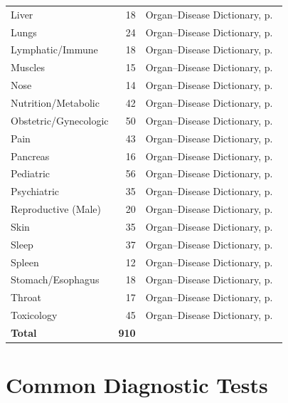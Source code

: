 \begin{tabularx}{\textwidth}{lrc}
Liver                & 18  & Organ--Disease Dictionary, p.~\pageref{sec:organ_liver} \\
Lungs                & 24  & Organ--Disease Dictionary, p.~\pageref{sec:organ_lungs} \\
Lymphatic/Immune     & 18  & Organ--Disease Dictionary, p.~\pageref{sec:organ_lymph} \\
Muscles              & 15  & Organ--Disease Dictionary, p.~\pageref{sec:organ_muscles} \\
Nose                 & 14  & Organ--Disease Dictionary, p.~\pageref{sec:organ_nose} \\
Nutrition/Metabolic  & 42  & Organ--Disease Dictionary, p.~\pageref{sec:organ_nutrition} \\
Obstetric/Gynecologic& 50  & Organ--Disease Dictionary, p.~\pageref{sec:organ_obstetric} \\
Pain                 & 43  & Organ--Disease Dictionary, p.~\pageref{sec:organ_pain} \\
Pancreas             & 16  & Organ--Disease Dictionary, p.~\pageref{sec:organ_pancreas} \\
Pediatric            & 56  & Organ--Disease Dictionary, p.~\pageref{sec:organ_pediatric} \\
Psychiatric          & 35  & Organ--Disease Dictionary, p.~\pageref{sec:organ_psychiatric} \\
Reproductive (Male)  & 20  & Organ--Disease Dictionary, p.~\pageref{sec:organ_reproductive} \\
Skin                 & 35  & Organ--Disease Dictionary, p.~\pageref{sec:organ_skin} \\
Sleep                & 37  & Organ--Disease Dictionary, p.~\pageref{sec:organ_sleep} \\
Spleen               & 12  & Organ--Disease Dictionary, p.~\pageref{sec:organ_spleen} \\
Stomach/Esophagus    & 18  & Organ--Disease Dictionary, p.~\pageref{sec:organ_stomach} \\
Throat               & 17  & Organ--Disease Dictionary, p.~\pageref{sec:organ_throat} \\
Toxicology           & 45  & Organ--Disease Dictionary, p.~\pageref{sec:organ_toxicology} \\
\midrule
\textbf{Total}       & \textbf{910} & \\
\bottomrule
\end{tabularx}

\section*{Common Diagnostic Tests}
\label{sec:quickref_tests}

